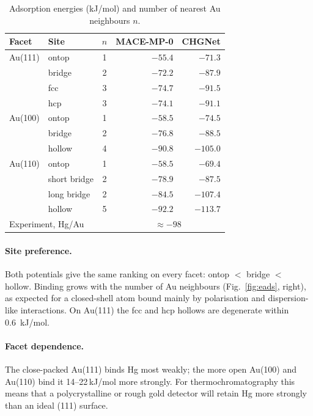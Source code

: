 \documentclass[11pt,a4paper]{article}
\begin{document}
\begin{table}[h]\centering
\caption{Adsorption energies (kJ/mol) and number of nearest Au neighbours $n$.}\label{tab:sites}
\begin{tabular}{llcrr}\toprule
Facet & Site & $n$ & MACE-MP-0 & CHGNet\\\midrule
Au(111) & ontop & 1 & $-55.4$ & $-71.3$\\
        & bridge & 2 & $-72.2$ & $-87.9$\\
        & fcc & 3 & $\mathbf{-74.7}$ & $\mathbf{-91.5}$\\
        & hcp & 3 & $-74.1$ & $-91.1$\\\midrule
Au(100) & ontop & 1 & $-58.5$ & $-74.5$\\
        & bridge & 2 & $-76.8$ & $-88.5$\\
        & hollow & 4 & $\mathbf{-90.8}$ & $\mathbf{-105.0}$\\\midrule
Au(110) & ontop & 1 & $-58.5$ & $-69.4$\\
        & short bridge & 2 & $-78.9$ & $-87.5$\\
        & long bridge & 2 & $-84.5$ & $-107.4$\\
        & hollow & 5 & $\mathbf{-92.2}$ & $\mathbf{-113.7}$\\\midrule
\multicolumn{3}{l}{Experiment, Hg/Au~\cite{eichler2013}} & \multicolumn{2}{c}{$\approx-98$}\\\bottomrule
\end{tabular}\end{table}

\paragraph{Site preference.} Both potentials give the same ranking on every facet: ontop $<$ bridge $<$
hollow. Binding grows with the number of Au neighbours (Fig.~\ref{fig:eads}, right), as expected for a
closed-shell atom bound mainly by polarisation and dispersion-like interactions. On Au(111) the fcc and hcp
hollows are degenerate within \SI{0.6}{kJ/mol}.

\paragraph{Facet dependence.} The close-packed Au(111) binds Hg most weakly; the more open Au(100) and Au(110)
bind it 14--22\,kJ/mol more strongly. For thermochromatography this means that a polycrystalline or rough
gold detector will retain Hg more strongly than an ideal (111) surface.
\end{document}
